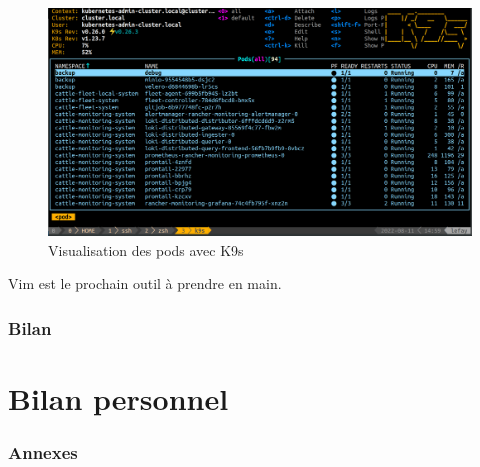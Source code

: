 \documentclass[12pt, a4paper, twoside]{article}
\begin{document}
\begin{figure}[!ht]
    \centering
        \includegraphics[width=\textwidth]{src/interface_k9s.png}
    \caption{Visualisation des pods avec K9s}
    \label{fig:k9s}
\end{figure}

Vim est le prochain outil à prendre en main.

\newpage
\section{Bilan}

\newpage
\part{Bilan personnel}


\newpage
\section*{Annexes}
\end{document}
